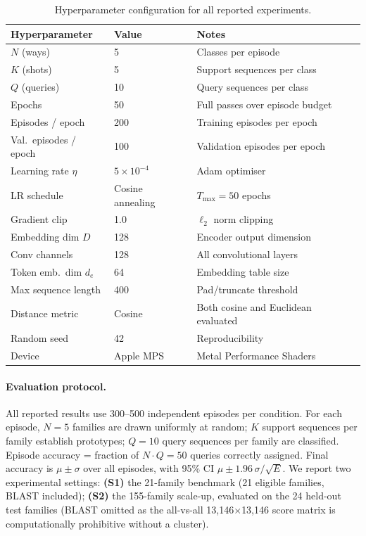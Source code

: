 \documentclass[11pt,a4paper]{article}
\begin{document}
\begin{table}[H]
\centering
\caption{Hyperparameter configuration for all reported experiments.}
\label{tab:hyperparams}
\begin{tabular}{lll}
\toprule
\textbf{Hyperparameter} & \textbf{Value} & \textbf{Notes} \\
\midrule
$N$ (ways)            & 5     & Classes per episode \\
$K$ (shots)           & 5     & Support sequences per class \\
$Q$ (queries)         & 10    & Query sequences per class \\
Epochs                & 50    & Full passes over episode budget \\
Episodes / epoch      & 200   & Training episodes per epoch \\
Val.\ episodes / epoch& 100   & Validation episodes per epoch \\
Learning rate $\eta$  & $5\times10^{-4}$ & Adam optimiser \\
LR schedule           & Cosine annealing & $T_{\max}=50$ epochs \\
Gradient clip         & 1.0   & $\ell_2$ norm clipping \\
Embedding dim $D$     & 128   & Encoder output dimension \\
Conv channels         & 128   & All convolutional layers \\
Token emb.\ dim $d_e$ & 64    & Embedding table size \\
Max sequence length   & 400   & Pad/truncate threshold \\
Distance metric       & Cosine & Both cosine and Euclidean evaluated \\
Random seed           & 42    & Reproducibility \\
Device                & Apple MPS & Metal Performance Shaders \\
\bottomrule
\end{tabular}
\end{table}

\paragraph{Evaluation protocol.}
All reported results use 300--500 independent episodes per condition.  For each
episode, $N=5$ families are drawn uniformly at random; $K$ support sequences per
family establish prototypes; $Q=10$ query sequences per family are classified.
Episode accuracy = fraction of $N \cdot Q = 50$ queries correctly assigned.
Final accuracy is $\mu \pm \sigma$ over all episodes, with 95\% CI
$\mu \pm 1.96\,\sigma/\sqrt{E}$.  We report two experimental settings:
\textbf{(S1)} the 21-family benchmark (21 eligible families, BLAST included);
\textbf{(S2)} the 155-family scale-up, evaluated on the 24 held-out test
families (BLAST omitted as the all-vs-all 13,146$\times$13,146 score matrix
is computationally prohibitive without a cluster).
\end{document}

